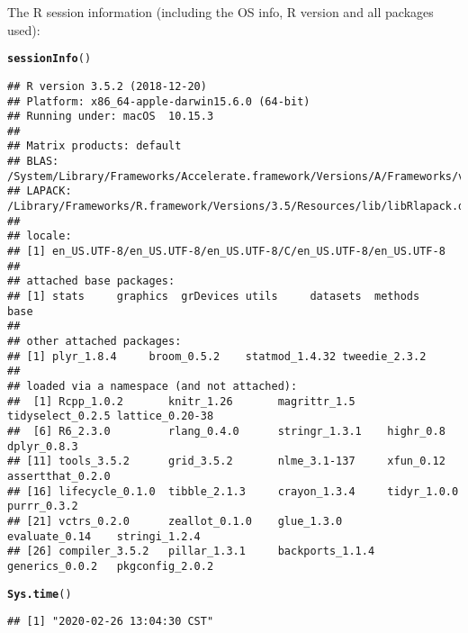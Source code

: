 \documentclass{article}\usepackage[]{graphicx}\usepackage[]{color}
\makeatletter
\newcommand{\hlstd}[1]{\textcolor[rgb]{0.345,0.345,0.345}{#1}}%
\newcommand{\hlkwd}[1]{\textcolor[rgb]{0.737,0.353,0.396}{\textbf{#1}}}%
\newenvironment{kframe}{%
 \def\at@end@of@kframe{}%
 \ifinner\ifhmode%
  \def\at@end@of@kframe{\end{minipage}}%
  \begin{minipage}{\columnwidth}%
 \fi\fi%
 \def\FrameCommand##1{\hskip\@totalleftmargin \hskip-\fboxsep
 \colorbox{shadecolor}{##1}\hskip-\fboxsep
     \hskip-\linewidth \hskip-\@totalleftmargin \hskip\columnwidth}%
 \MakeFramed {\advance\hsize-\width
   \@totalleftmargin\z@ \linewidth\hsize
   \@setminipage}}%
 {\par\unskip\endMakeFramed%
 \at@end@of@kframe}
\newenvironment{knitrout}{}{} %
\makeatother
\begin{document}
The R session information (including the OS info, R version and all
packages used):

\begin{knitrout}
\color{fgcolor}\begin{kframe}
\begin{alltt}
\hlkwd{sessionInfo}\hlstd{()}
\end{alltt}
\begin{verbatim}
## R version 3.5.2 (2018-12-20)
## Platform: x86_64-apple-darwin15.6.0 (64-bit)
## Running under: macOS  10.15.3
## 
## Matrix products: default
## BLAS: /System/Library/Frameworks/Accelerate.framework/Versions/A/Frameworks/vecLib.framework/Versions/A/libBLAS.dylib
## LAPACK: /Library/Frameworks/R.framework/Versions/3.5/Resources/lib/libRlapack.dylib
## 
## locale:
## [1] en_US.UTF-8/en_US.UTF-8/en_US.UTF-8/C/en_US.UTF-8/en_US.UTF-8
## 
## attached base packages:
## [1] stats     graphics  grDevices utils     datasets  methods   base     
## 
## other attached packages:
## [1] plyr_1.8.4     broom_0.5.2    statmod_1.4.32 tweedie_2.3.2 
## 
## loaded via a namespace (and not attached):
##  [1] Rcpp_1.0.2       knitr_1.26       magrittr_1.5     tidyselect_0.2.5 lattice_0.20-38 
##  [6] R6_2.3.0         rlang_0.4.0      stringr_1.3.1    highr_0.8        dplyr_0.8.3     
## [11] tools_3.5.2      grid_3.5.2       nlme_3.1-137     xfun_0.12        assertthat_0.2.0
## [16] lifecycle_0.1.0  tibble_2.1.3     crayon_1.3.4     tidyr_1.0.0      purrr_0.3.2     
## [21] vctrs_0.2.0      zeallot_0.1.0    glue_1.3.0       evaluate_0.14    stringi_1.2.4   
## [26] compiler_3.5.2   pillar_1.3.1     backports_1.1.4  generics_0.0.2   pkgconfig_2.0.2
\end{verbatim}
\begin{alltt}
\hlkwd{Sys.time}\hlstd{()}
\end{alltt}
\begin{verbatim}
## [1] "2020-02-26 13:04:30 CST"
\end{verbatim}
\end{kframe}
\end{knitrout}
\end{document}

